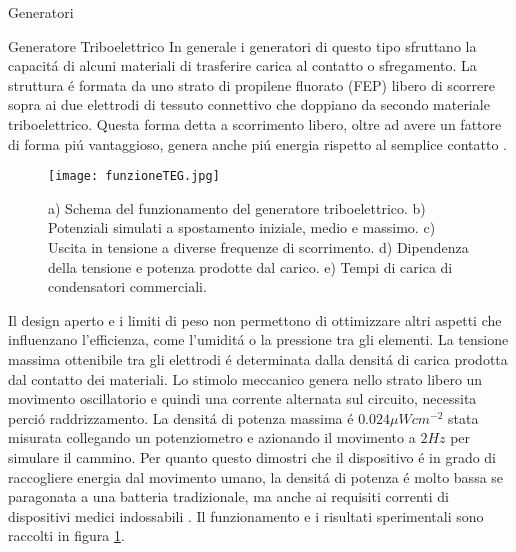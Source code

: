 \begin{section}{Generatori}
    \begin{subsection}{Generatore Triboelettrico}
        In generale i generatori di questo tipo sfruttano la capacit\'a di alcuni materiali di trasferire carica al contatto o sfregamento. La struttura \'e formata da uno strato di propilene fluorato (FEP) libero di scorrere sopra ai due elettrodi di tessuto connettivo che doppiano da secondo materiale triboelettrico. Questa forma detta a scorrimento libero, oltre ad avere un fattore di forma pi\'u vantaggioso, genera anche pi\'u energia rispetto al semplice contatto \cite{fuAchievingUltraDurabilityHigh2024}. 
        \begin{figure}[H]
            \texttt{[image: funzioneTEG.jpg]}
            \centering
            \caption{a) Schema del funzionamento del generatore triboelettrico. b) Potenziali simulati a spostamento iniziale, medio e massimo. c) Uscita in tensione a diverse frequenze di scorrimento. d) Dipendenza della tensione e potenza prodotte dal carico. e) Tempi di carica di condensatori commerciali.\cite{kouWearableAllFabricHybrid2024}}
            \label{fig:funzioneTEG}
        \end{figure}
        Il design aperto e i limiti di peso non permettono di ottimizzare altri aspetti che influenzano l'efficienza, come l'umidit\'a o la pressione tra gli elementi. La tensione massima ottenibile tra gli elettrodi \'e determinata dalla densit\'a di carica prodotta dal contatto dei materiali. Lo stimolo meccanico genera nello strato libero un movimento oscillatorio e quindi una corrente alternata sul circuito, necessita perci\'o raddrizzamento. La densit\'a di potenza massima \'e \(0.024\mu Wcm^{-2}\) stata misurata collegando un potenziometro e azionando il movimento a \(2Hz\) per simulare il cammino. Per quanto questo dimostri che il dispositivo \'e in grado di raccogliere energia dal movimento umano, la densit\'a di potenza \'e molto bassa se paragonata a una batteria tradizionale, ma anche ai requisiti correnti di dispositivi medici indossabili \cite{gaoAdvancedEnergyHarvesters2024}. Il funzionamento e i risultati sperimentali sono raccolti in figura \ref{fig:funzioneTEG}.
        
    \end{subsection}
    

\end{section}
